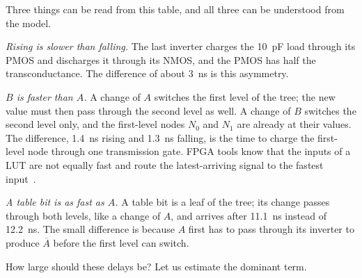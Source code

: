 \documentclass[11pt,a4paper]{article}
\newcommand{\ovl}[1]{\overline{#1}}
\begin{document}
Three things can be read from this table, and all three can be
understood from the model.

\emph{Rising is slower than falling.} The last inverter charges the
\SI{10}{pF} load through its PMOS and discharges it through its NMOS,
and the PMOS has half the transconductance. The difference of about
\SI{3}{ns} is this asymmetry.

\emph{$B$ is faster than $A$.} A change of $A$ switches the first
level of the tree; the new value must then pass through the second
level as well. A change of $B$ switches the second level only, and
the first-level nodes $N_0$ and $N_1$ are already at their values. The
difference, \SI{1.4}{ns} rising and \SI{1.3}{ns} falling, is the time
to charge the first-level node through one transmission gate. FPGA
tools know that the inputs of a LUT are not equally fast and route
the latest-arriving signal to the fastest input~\cite{Ahmed2004}.

\emph{A table bit is as fast as $A$.} A table bit is a leaf of the
tree; its change passes through both levels, like a change of $A$,
and arrives after \SI{11.1}{ns} instead of \SI{12.2}{ns}. The small
difference is because $A$ first has to pass through its inverter to
produce $\ovl A$ before the first level can switch.

How large should these delays be? Let us estimate the dominant term.
\end{document}
